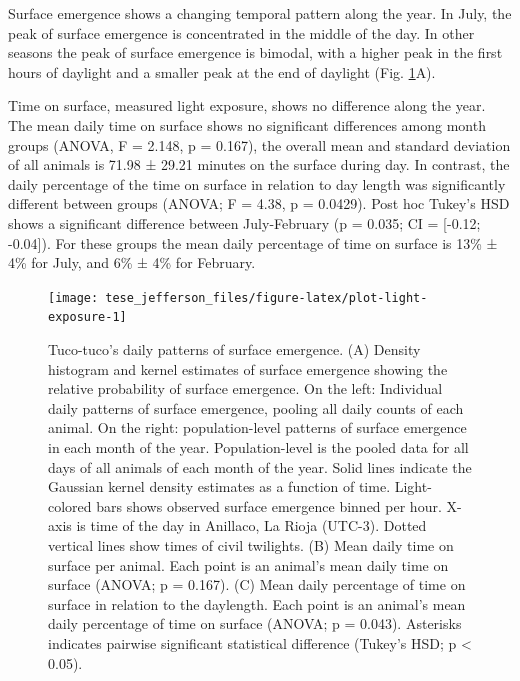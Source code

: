 \documentclass[english,msc,numbers,hidelinks]{coppe}
\begin{document}
  Surface emergence shows a changing temporal pattern along the year. In July, the peak of surface emergence is concentrated in the middle of the day. In other seasons the peak of surface emergence is bimodal, with a higher peak in the first hours of daylight and a smaller peak at the end of daylight (Fig. \ref{fig:plot-light-exposure}A).

  Time on surface, measured light exposure, shows no difference along the year. The mean daily time on surface shows no significant differences among month groups (ANOVA, F = 2.148, p = 0.167), the overall mean and standard deviation of all animals is 71.98 ± 29.21 minutes on the surface during day. In contrast, the daily percentage of the time on surface in relation to day length was significantly different between groups (ANOVA; F = 4.38, p = 0.0429). Post hoc Tukey's HSD shows a significant difference between July-February (p = 0.035; CI = {[}-0.12; -0.04{]}). For these groups the mean daily percentage of time on surface is 13\% ± 4\% for July, and 6\% ± 4\% for February.\newline
  \begin{figure}[H]

  {\centering \texttt{[image: tese\_jefferson\_files/figure-latex/plot-light-exposure-1]} 

  }

  \caption{Tuco-tuco’s daily patterns of surface emergence. (A) Density histogram and kernel estimates of surface emergence showing the relative probability of surface emergence. On the left: Individual daily patterns of surface emergence, pooling all daily counts of each animal. On the right: population-level patterns of surface emergence in each month of the year. Population-level is the pooled data for all days of all animals of each month of the year. Solid lines indicate the Gaussian kernel density estimates as a function of time. Light-colored bars shows observed surface emergence binned per hour. X-axis is time of the day in Anillaco, La Rioja (UTC-3). Dotted vertical lines show times of civil twilights. (B) Mean daily time on surface per animal. Each point is an animal’s mean daily time on surface (ANOVA; p = 0.167). (C) Mean daily percentage of time on surface in relation to the daylength. Each point is an animal’s mean daily percentage of time on surface (ANOVA; p = 0.043). Asterisks indicates pairwise significant statistical difference (Tukey’s HSD; p < 0.05).}\label{fig:plot-light-exposure}
  \end{figure}
  \clearpage
\end{document}
